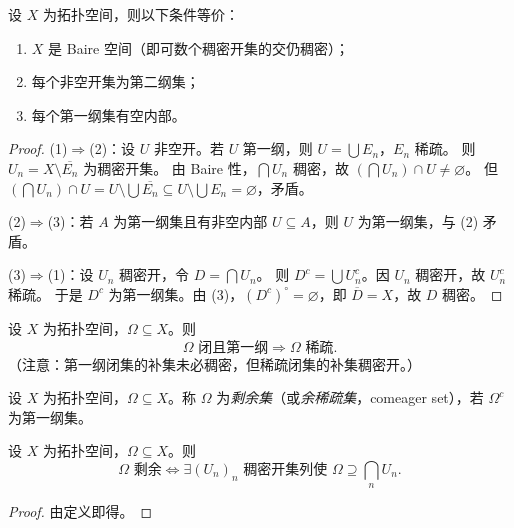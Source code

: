 \documentclass[lang=cn,a4paper,newtx,figureplace=section,tableplace=section]{elegantbook}
\begin{document}
\begin{proposition}\label{prop:baire-equiv-conditions}
  设 $X$ 为拓扑空间，则以下条件等价：
  \begin{enumerate}[(1)]
    \item $X$ 是 Baire 空间（即可数个稠密开集的交仍稠密）；
    \item 每个非空开集为第二纲集；
    \item 每个第一纲集有空内部。
  \end{enumerate}
\end{proposition}
\begin{proof}
  (1)$\Rightarrow$(2)：设 $U$ 非空开。若 $U$ 第一纲，则 $U=\bigcup E_n$，$E_n$ 稀疏。
  则 $U_n = X\setminus \overline{E_n}$ 为稠密开集。
  由 Baire 性，$\bigcap U_n$ 稠密，故 $(\bigcap U_n)\cap U \neq \varnothing$。
  但 $(\bigcap U_n)\cap U = U \setminus \bigcup \overline{E_n} \subseteq U \setminus \bigcup E_n = \varnothing$，矛盾。

  (2)$\Rightarrow$(3)：若 $A$ 为第一纲集且有非空内部 $U \subseteq A$，则 $U$ 为第一纲集，与 (2) 矛盾。

  (3)$\Rightarrow$(1)：设 $U_n$ 稠密开，令 $D = \bigcap U_n$。
  则 $D^c = \bigcup U_n^c$。因 $U_n$ 稠密开，故 $U_n^c$ 稀疏。
  于是 $D^c$ 为第一纲集。由 (3)，$(D^c)^\circ = \varnothing$，即 $\overline D = X$，故 $D$ 稠密。
\end{proof}

\begin{proposition}\label{prop:open-iff-complement-closed}
  设 $X$ 为拓扑空间，$\Omega\subseteq X$。则
  \[
    \Omega\text{ 闭且第一纲}\Rightarrow\Omega\text{ 稀疏}.
  \]
  （注意：第一纲闭集的补集未必稠密，但稀疏闭集的补集稠密开。）
\end{proposition}

\begin{definition}[剩余集]\label{def:residual-set}
  设 $X$ 为拓扑空间，$\Omega\subseteq X$。称 $\Omega$ 为\emph{剩余集}（或\emph{余稀疏集}，comeager set），若 $\Omega^c$ 为第一纲集。
\end{definition}

\begin{proposition}\label{prop:residual-equiv}
  设 $X$ 为拓扑空间，$\Omega\subseteq X$。则
  \[
    \Omega\text{ 剩余}\Leftrightarrow\exists (U_n)_n\text{ 稠密开集列使 }\Omega\supseteq\bigcap_n U_n.
  \]
\end{proposition}
\begin{proof}
  由定义即得。
\end{proof}
\end{document}

